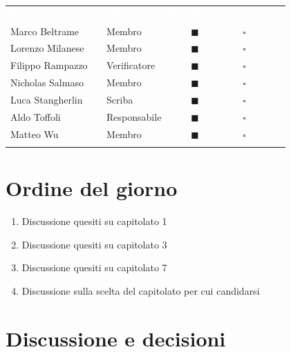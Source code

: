 \documentclass[12pt,a4paper]{article}
\newcommand{\tightlist}{\setlength{\itemsep}{1pt}\setlength{\parskip}{0pt}}
\begin{document}
\begin{center}
\begin{tabularx}{\linewidth}{>{\raggedright\arraybackslash}X>{\centering\arraybackslash}X>{\centering\arraybackslash}p{2.2cm}>{\centering\arraybackslash}p{2.2cm}}
\rowcolor{bfblue}\textcolor{white}{\textbf{Nome e Cognome}} & \textcolor{white}{\textbf{Ruolo Progetto}} & \textcolor{white}{\textbf{Presente}} & \textcolor{white}{\textbf{Assente}} \\
Marco Beltrame & Membro & $\blacksquare$ & $\square$ \\ \arrayrulecolor{bfline}\hline
Lorenzo Milanese & Membro & $\blacksquare$ & $\square$ \\ \arrayrulecolor{bfline}\hline
Filippo Rampazzo & Verificatore & $\blacksquare$ & $\square$ \\ \arrayrulecolor{bfline}\hline
Nicholas Salmaso & Membro & $\blacksquare$ & $\square$ \\ \arrayrulecolor{bfline}\hline
Luca Stangherlin & Scriba & $\blacksquare$ & $\square$ \\ \arrayrulecolor{bfline}\hline
Aldo Toffoli & Responsabile & $\blacksquare$ & $\square$ \\ \arrayrulecolor{bfline}\hline
Matteo Wu & Membro & $\blacksquare$ & $\square$ \\ \arrayrulecolor{bfline}\hline
\end{tabularx}
\end{center}



\hypertarget{ordine-del-giorno}{%
\section{Ordine del giorno}}

\begin{enumerate}
\tightlist
\item {Discussione quesiti su capitolato 1}
\item {Discussione quesiti su capitolato 3}
\item {Discussione quesiti su capitolato 7}
\item {Discussione sulla scelta del capitolato per cui candidarsi}
\end{enumerate}

\newpage
\hypertarget{discussione-e-decisioni}{%
\section{Discussione e decisioni}}
\end{document}
